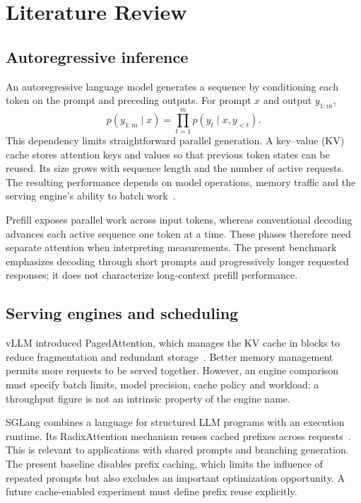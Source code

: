 \chapter{Literature Review}
\label{chap:lr}

\section{Autoregressive inference}
An autoregressive language model generates a sequence by conditioning each token on the prompt and preceding outputs. For prompt $x$ and output $y_{1:m}$,
\begin{equation}
p(y_{1:m}\mid x)=\prod_{t=1}^{m}p(y_t\mid x,y_{<t}).
\end{equation}
This dependency limits straightforward parallel generation. A key--value (KV) cache stores attention keys and values so that previous token states can be reused. Its size grows with sequence length and the number of active requests. The resulting performance depends on model operations, memory traffic and the serving engine's ability to batch work~\cite{vllm,specdec}.

Prefill exposes parallel work across input tokens, whereas conventional decoding advances each active sequence one token at a time. These phases therefore need separate attention when interpreting measurements. The present benchmark emphasizes decoding through short prompts and progressively longer requested responses; it does not characterize long-context prefill performance.

\section{Serving engines and scheduling}
vLLM introduced PagedAttention, which manages the KV cache in blocks to reduce fragmentation and redundant storage~\cite{vllm}. Better memory management permits more requests to be served together. However, an engine comparison must specify batch limits, model precision, cache policy and workload: a throughput figure is not an intrinsic property of the engine name.

SGLang combines a language for structured LLM programs with an execution runtime. Its RadixAttention mechanism reuses cached prefixes across requests~\cite{sglang}. This is relevant to applications with shared prompts and branching generation. The present baseline disables prefix caching, which limits the influence of repeated prompts but also excludes an important optimization opportunity. A future cache-enabled experiment must define prefix reuse explicitly.

